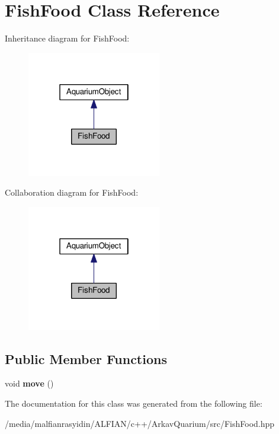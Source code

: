 \hypertarget{class_fish_food}{}\section{Fish\+Food Class Reference}
\label{class_fish_food}


Inheritance diagram for Fish\+Food\+:\nopagebreak
\begin{figure}[H]
\begin{center}
\leavevmode
\includegraphics[width=166pt]{class_fish_food__inherit__graph}
\end{center}
\end{figure}


Collaboration diagram for Fish\+Food\+:\nopagebreak
\begin{figure}[H]
\begin{center}
\leavevmode
\includegraphics[width=166pt]{class_fish_food__coll__graph}
\end{center}
\end{figure}
\subsection*{Public Member Functions}
\begin{DoxyCompactItemize}
\item 
\mbox{\label{class_fish_food_a411070d0e4f5c964ff34ca17fca0ec05}} 
void {\bfseries move} ()
\end{DoxyCompactItemize}


The documentation for this class was generated from the following file\+:\begin{DoxyCompactItemize}
\item 
/media/malfianrasyidin/\+A\+L\+F\+I\+A\+N/c++/\+Arkav\+Quarium/src/Fish\+Food.\+hpp\end{DoxyCompactItemize}
